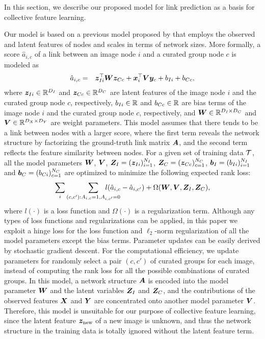 \documentclass[letterpaper]{article} %
\begin{document}
In this section, we describe our proposed model for link prediction as a basis for collective feature learning.

Our model is based on a previous model proposed by \cite{Menon2011} that employs the observed and latent features of nodes and scales in terms of network sizes.
%
More formally, a score $\hat{a}_{i,c}$ of a link between an image node $i$ and a curated group node $c$ is modeled as
\begin{eqnarray}
  \hat{a}_{i,c} &=& \bm{z}_{Ii}^{\top}\bm{W}\bm{z}_{Cc} + \bm{x}_i^{\top}\bm{V}\bm{y}_c + b_{Ii} + b_{Cc},
  \label{eq:linkscore:old}
\end{eqnarray}
where $\bm{z}_{Ii}\in\mathbb R^{D_I}$ and $\bm{z}_{Cc}\in\mathbb R^{D_C}$ are latent features of the image node $i$ and the curated group node $c$, respectively, $b_{Ii}\in\mathbb R$ and $b_{Cc}\in\mathbb R$ are bias terms of the image node $i$ and the curated group node $c$, respectively, and $\bm{W}\in\mathbb R^{D_I\times D_C}$ and $\bm{V}\in\mathbb R^{D_X\times D_Y}$ are weight parameters.
%
This model assumes that there tends to be a link between nodes with a larger score, where the first term reveals the network structure by factorizing the ground-truth link matrix $\bm{A}$, and the second term reflects the feature similarity between nodes.
%
For a given set of training data $\mathcal T$, all the model parameters $\bm{W}$, $\bm{V}$, $\bm{Z}_I=(\bm{z}_{Ii})_{i=1}^{N_I}$, $\bm{Z}_C=(\bm{z}_{Cc})_{c=1}^{N_C}$, $\bm{b}_I=(b_{Ii})_{i=1}^{N_I}$ and $\bm{b}_C=(b_{Ci})_{c=1}^{N_C}$ are optimized to minimize the following expected rank loss:
\begin{eqnarray}
  \sum_i \sum_{(c,c'):A_{i,c}=1,A_{i,c'}=0}
    \hspace{-8mm}l(\hat{a}_{i,c}-\hat{a}_{i,c'}) + \Omega(\W, \V, \Z_I, \Z_C),
  \label{eq:linkloss}
\end{eqnarray}
where $l(\cdot)$ is a loss function and $\Omega(\cdot)$ is a regularization term.
%
Although any types of loss functions and regularizations can be applied, in this paper we exploit a hinge loss for the loss function and $\ell_2$-norm regularization of all the model parameters except the bias terms.
%
Parameter updates can be easily derived by stochastic gradient descent.
%
For the computational efficiency, we update parameters for randomly select a pair $(c,c')$ of curated groups for each image, instead of computing the rank loss for all the possible combinations of curated groups.
%
In this model, a network structure $\bm{A}$ is encoded into the model parameter $\bm{W}$ and the latent variables $\bm{Z}_I$ and $\bm{Z}_C$, and the contributions of the observed features $\bm{X}$ and $\bm{Y}$ are concentrated onto another model parameter $\bm{V}$.
%
Therefore, this model is unsuitable for our purpose of collective feature learning, since the latent feature $\bm{z}_{\rm{new}}$ of a new image is unknown, and thus the network structure in the training data is totally ignored without the latent feature term.
\end{document}
